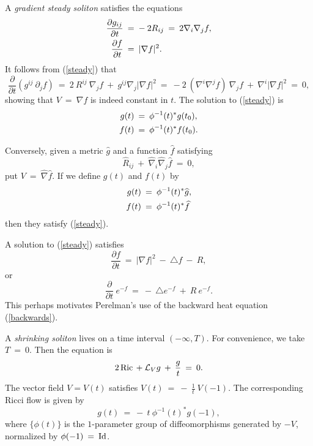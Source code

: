 A {\em gradient steady soliton}
satisfies the equations
\begin{align} \label{steady}
\frac{\partial g_{ij}}{\partial t} \: & = \: - \: 2 R_{ij} \: = \:
2 \nabla_i \nabla_j f, \\
\frac{\partial f}{\partial t} \: & = \: |\nabla f|^2. \notag
\end{align}
It follows from (\ref{steady}) that
\begin{equation}
\frac{\partial}{\partial t} \left( g^{ij} \: \partial_j f \right) \: = \:
2 \: R^{ij} \: \nabla_j f \: + \: g^{ij} \nabla_j |\nabla f|^2 \: = \:
- 2 \: (\nabla^i \nabla^j f) \: \nabla_j f \: + \: \nabla^i
|\nabla f|^2 \: = \: 0,
\end{equation}
showing that $V \: = \: \nabla f$ is indeed constant in $t$.
The solution to (\ref{steady}) is
\begin{align} \label{steadysoln}
g(t) \: & = \: \phi^{-1}(t)^* g(t_0), \\
f(t) \: & = \: \phi^{-1}(t)^* f(t_0). \notag
\end{align}

Conversely, given a metric $\widehat{g}$ and a function $\widehat{f}$
satisfying
\begin{equation}
\widehat{R}_{ij} \: + \: \widehat{\nabla}_i \widehat{\nabla}_j \widehat{f}
\: = \: 0,
\end{equation}
put $V \: = \: \widehat{\nabla} \widehat{f}$.
If we define $g(t)$ and $f(t)$ by
\begin{align}
g(t) \: & = \: \phi^{-1}(t)^* \widehat{g}, \\
f(t) \: & = \: \phi^{-1}(t)^* \widehat{f} \notag
\end{align}
then they satisfy (\ref{steady}).


A solution to (\ref{steady}) satisfies
\begin{equation}
\frac{\partial f}{\partial t} \: = \: |\nabla f|^2 \: - \: \triangle f
\: - \: R,
\end{equation}
or
\begin{equation}
\frac{\partial}{\partial t} \: e^{-f} \: = \: - \: \triangle e^{-f}
\: + \: R \: e^{-f}.
\end{equation}
This perhaps motivates Perelman's use of the backward heat
equation (\ref{backwards}).


A {\em shrinking soliton} lives on a time interval $(-\infty, T)$.
For convenience, we take $T \: = \: 0$. Then the equation is
\begin{equation}
2 \operatorname{Ric} \: + \: {\mathcal L}_V g \: + \: \frac{g}{t} \: = \: 0.
\end{equation}
The vector field $V = V(t)$ satisfies
$V(t) \: = \: - \: \frac{1}{t} \: V(-1)$.
The corresponding Ricci flow is given by
\begin{equation} \label{shrinkingflow}
g(t) \: = \: - \: t \: \phi^{-1}(t)^* g(-1),
\end{equation}
where $\{ \phi(t) \}$ is the $1$-parameter group of diffeomorphisms generated
by $- V$, normalized by $\phi(-1) \: = \: \operatorname{Id}$.


